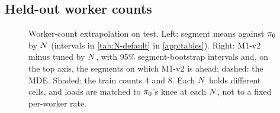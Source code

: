 \subsection{Held-out worker counts}
\label{sec:res-n}

\begin{figure}[tbp]
  \centering
  
  \caption{Worker-count extrapolation on test. Left: segment means
    against $\pi_{0}$ by $N$ (intervals in \cref{tab:N-default} in \cref{app:tables}).
    Right: M1-v2 minus tuned  by $N$, with 95\% segment-bootstrap intervals and,
    on the top axis, the segments on which M1-v2 is ahead; dashed: the MDE.
    Shaded: the train counts 4 and 8. Each $N$ holds different cells, and loads are matched to
    $\pi_{0}$'s knee at each $N$, not to a fixed per-worker rate.}
  \label{fig:n-extrapolation}
\end{figure}

